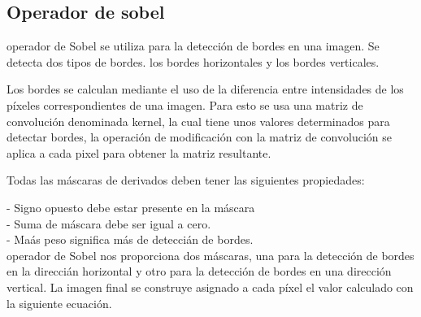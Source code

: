 \documentclass[journal]{IEEEtran}
\begin{document}
\subsection{Operador de sobel}
operador de Sobel se utiliza para la detecci\'on de bordes en una imagen. Se detecta dos tipos de bordes. los bordes horizontales y los bordes verticales. 

Los bordes se calculan mediante el uso de la diferencia entre intensidades de los p\'ixeles correspondientes de una imagen. Para esto se usa una matriz de convoluci\'on  denominada kernel, la cual tiene unos valores determinados para detectar bordes, la operaci\'on de modificaci\'on con la matriz de convoluci\'on se aplica a cada pixel para obtener la matriz resultante.



%
Todas las m\'ascaras de derivados deben tener las siguientes propiedades: 

- Signo opuesto debe estar presente en la m\'ascara \\
- Suma de m\'ascara debe ser igual a cero. \\
- Ma\'as peso significa m\'as de detecci\'an de bordes. \\

operador de Sobel nos proporciona dos m\'ascaras, una para la detecci\'on de bordes en la direcci\'an horizontal y otro para la detecci\'on de bordes en una direcci\'on vertical. La imagen final se construye asignado a cada p\'ixel el valor calculado con la siguiente ecuaci\'on.
\end{document}
